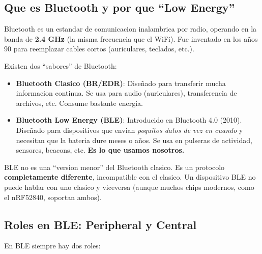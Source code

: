 \documentclass[11pt,a4paper]{article}
\begin{document}
\subsection{Que es Bluetooth y por que ``Low Energy''}

Bluetooth es un estandar de comunicacion inalambrica por radio,
operando en la banda de \textbf{2.4 GHz} (la misma frecuencia que
el WiFi). Fue inventado en los años 90 para reemplazar cables cortos
(auriculares, teclados, etc.).

Existen dos ``sabores'' de Bluetooth:

\begin{itemize}
    \item \textbf{Bluetooth Clasico (BR/EDR)}: Diseñado para
          transferir mucha informacion continua. Se usa para audio
          (auriculares), transferencia de archivos, etc. Consume
          bastante energia.

    \item \textbf{Bluetooth Low Energy (BLE)}: Introducido en
          Bluetooth 4.0 (2010). Diseñado para dispositivos que
          envian \emph{poquitos datos de vez en cuando} y necesitan
          que la bateria dure meses o años. Se usa en pulseras de
          actividad, sensores, beacons, etc. \textbf{Es lo que
          usamos nosotros.}
\end{itemize}

BLE no es una ``version menor'' del Bluetooth clasico. Es un
protocolo \textbf{completamente diferente}, incompatible con el
clasico. Un dispositivo BLE no puede hablar con uno clasico y
viceversa (aunque muchos chips modernos, como el nRF52840,
soportan ambos).

\subsection{Roles en BLE: Peripheral y Central}

En BLE siempre hay dos roles:
\end{document}
